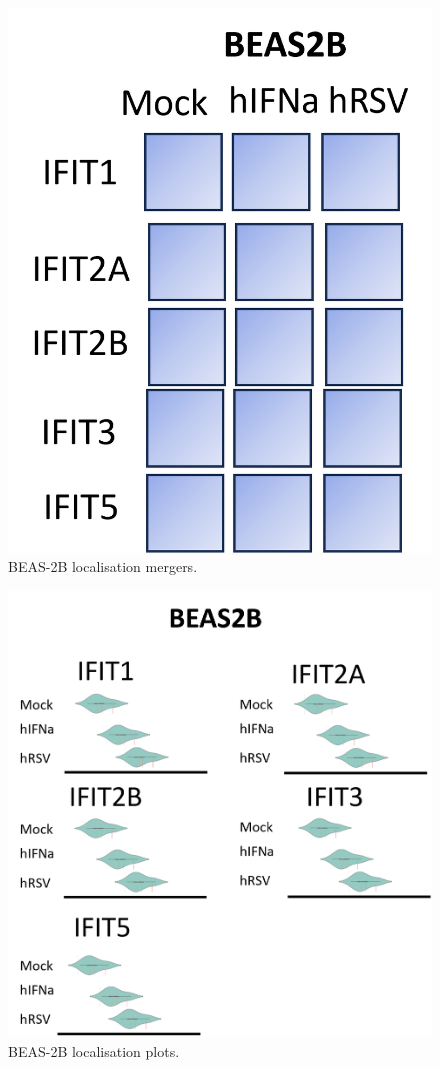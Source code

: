 \begin{figure}
    \centering
    \includegraphics[width=1\linewidth]{06. Chapter 1/Figs/02. Localisation/03. beas2b merges.png}
    \caption[BEAS-2B localisation mergers.]{BEAS-2B localisation mergers.}
    \label{BEAS-2B localisation mergers.}
\end{figure}


\begin{figure}
    \centering
    \includegraphics[width=1\linewidth]{06. Chapter 1/Figs/02. Localisation/04. beas2b plots.png}
    \caption[BEAS-2B localisation plots.]{BEAS-2B localisation plots.}
    \label{BEAS-2B localisation plots.}
\end{figure}



